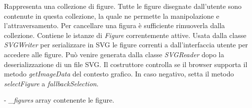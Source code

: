 Rappresenta una collezione di figure. Tutte le figure disegnate dall'utente sono contenute in questa collezione, la quale ne permette la manipolazione e l'attraversamento. Per cancellare una figura \`e sufficiente rimuoverla dalla collezione.
Contiene le istanze di \textit{Figure} correntemente attive.
Usata dalla classe \textit{SVGWriter} per serializzare in SVG le figure correnti a dall'interfaccia utente per accedere alle figure. Pu\`o venire generata dalla classe \textit{SVGReader} dopo la deserializzazione di un file SVG.
Il costruttore controlla se il browser supporta il metodo \textit{getImageData} del contesto grafico. In caso negativo, setta il metodo \textit{selectFigure} a \textit{fallbackSelection}.
\begin{elencopuntato}[\subsubsecindent]
\item[-] \textit{{\_}figures} array contenente le figure.
\end{elencopuntato}
